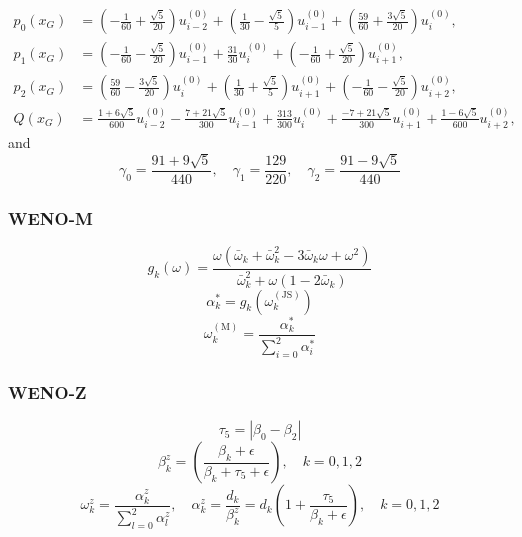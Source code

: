 \documentclass{article}
\numberwithin{equation}{subsection}    %
\begin{document}
\begin{equation}
    \begin{aligned}
        p_{0}\left(x_{G}\right) & =\left(-\frac{1}{60}+\frac{\sqrt{5}}{20}\right) u_{i-2}^{(0)}+\left(\frac{1}{30}-\frac{\sqrt{5}}{5}\right) u_{i-1}^{(0)}+\left(\frac{59}{60}+\frac{3 \sqrt{5}}{20}\right) u_{i}^{(0)},       \\
        p_{1}\left(x_{G}\right) & =\left(-\frac{1}{60}-\frac{\sqrt{5}}{20}\right) u_{i-1}^{(0)}+\frac{31}{30} u_{i}^{(0)}+\left(-\frac{1}{60}+\frac{\sqrt{5}}{20}\right) u_{i+1}^{(0)},                                        \\
        p_{2}\left(x_{G}\right) & =\left(\frac{59}{60}-\frac{3 \sqrt{5}}{20}\right) u_{i}^{(0)}+\left(\frac{1}{30}+\frac{\sqrt{5}}{5}\right) u_{i+1}^{(0)}+\left(-\frac{1}{60}-\frac{\sqrt{5}}{20}\right) u_{i+2}^{(0)},       \\
        Q\left(x_{G}\right)     & =\frac{1+6 \sqrt{5}}{600} u_{i-2}^{(0)}-\frac{7+21 \sqrt{5}}{300} u_{i-1}^{(0)}+\frac{313}{300} u_{i}^{(0)}+\frac{-7+21 \sqrt{5}}{300} u_{i+1}^{(0)}+\frac{1-6 \sqrt{5}}{600} u_{i+2}^{(0)},
    \end{aligned}
\end{equation}
and
\begin{equation}
    \gamma_{0}=\frac{91+9 \sqrt{5}}{440}, \quad \gamma_{1}=\frac{129}{220}, \quad \gamma_{2}=\frac{91-9 \sqrt{5}}{440}
\end{equation}
\subsubsection{WENO-M}
\begin{equation}
    g_{k}(\omega)=\frac{\omega\left(\bar{\omega}_{k}+\bar{\omega}_{k}^{2}-3 \bar{\omega}_{k} \omega+\omega^{2}\right)}{\bar{\omega}_{k}^{2}+\omega\left(1-2 \bar{\omega}_{k}\right)}
\end{equation}
\begin{equation}
    \alpha_{k}^{*}=g_{k}\left(\omega_{k}^{(\mathrm{JS})}\right)
\end{equation}
\begin{equation}
    \omega_{k}^{(\mathrm{M})}=\frac{\alpha_{k}^{*}}{\sum_{i=0}^{2} \alpha_{i}^{*}}
\end{equation}
\subsubsection{WENO-Z}
\begin{equation}
    \tau_{5}=\left|\beta_{0}-\beta_{2}\right|
\end{equation}
\begin{equation}
    \beta_{k}^{z}=\left(\frac{\beta_{k}+\epsilon}{\beta_{k}+\tau_{5}+\epsilon}\right), \quad k=0,1,2
\end{equation}
\begin{equation}
    \omega_{k}^{z}=\frac{\alpha_{k}^{z}}{\sum_{l=0}^{2} \alpha_{l}^{z}}, \quad \alpha_{k}^{z}=\frac{d_{k}}{\beta_{k}^{z}}=d_{k}\left(1+\frac{\tau_{5}}{\beta_{k}+\epsilon}\right), \quad k=0,1,2
\end{equation}
\end{document}
